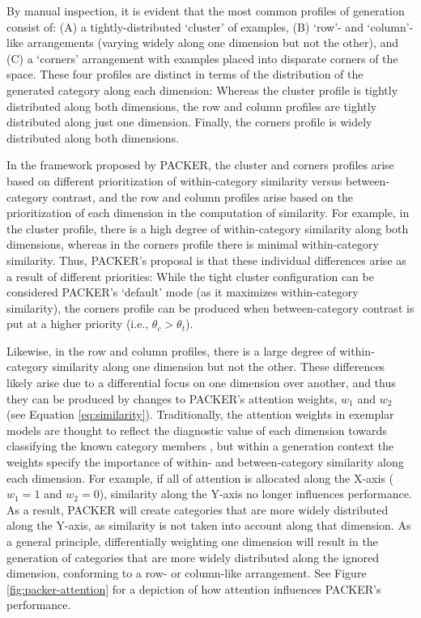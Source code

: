 \documentclass[pdflatex,sn-apa]{sn-jnl}%
\theoremstyle{thmstyleone}%
\theoremstyle{thmstyletwo}%
\theoremstyle{thmstylethree}%
\begin{document}
By manual inspection, it is evident that the most common profiles of generation
consist of: (A) a tightly-distributed `cluster' of examples, (B) `row'- and
`column'-like arrangements (varying widely along one dimension but not the
other), and (C) a `corners' arrangement with examples placed into disparate
corners of the space. These four profiles are distinct in terms of the
distribution of the generated category along each dimension: Whereas the cluster
profile is tightly distributed along both dimensions, the row and column
profiles are tightly distributed along just one dimension. Finally, the corners
profile is widely distributed along both dimensions.

In the framework proposed by PACKER, the cluster and corners profiles arise
based on different prioritization of within-category similarity versus
between-category contrast, and the row and column profiles arise based on the
prioritization of each dimension in the computation of similarity. For example,
in the cluster profile, there is a high degree of within-category similarity
along both dimensions, whereas in the corners profile there is minimal
within-category similarity. Thus, PACKER's proposal is that these individual
differences arise as a result of different priorities: While the tight cluster
configuration can be considered PACKER's `default' mode (as it maximizes
within-category similarity), the corners profile can be produced when
between-category contrast is put at a higher priority (i.e., $\theta_c > \theta_t$).

Likewise, in the row and column profiles, there is a large degree of
within-category similarity along one dimension but not the other. These
differences likely arise due to a differential focus on one dimension over
another, and thus they can be produced by changes to PACKER's attention weights,
$w_1$ and $w_2$ (see Equation \ref{eq:similarity}). Traditionally, the attention
weights in exemplar models are thought to reflect the diagnostic value of each
dimension towards classifying the known category members
\citep{nosofsky1984choice,nosofsky1986attention,kruschke1992alcove}, but within
a generation context the weights specify the importance of within- and
between-category similarity along each dimension. For example, if all of
attention is allocated along the X-axis ($w_1=1$ and $w_2=0$), similarity along
the Y-axis no longer influences performance. As a result, PACKER will create
categories that are more widely distributed along the Y-axis, as similarity is
not taken into account along that dimension. As a general principle,
differentially weighting one dimension will result in the generation of
categories that are more widely distributed along the ignored dimension,
conforming to a row- or column-like arrangement. See Figure
\ref{fig:packer-attention} for a depiction of how attention influences PACKER's
performance.
\end{document}
